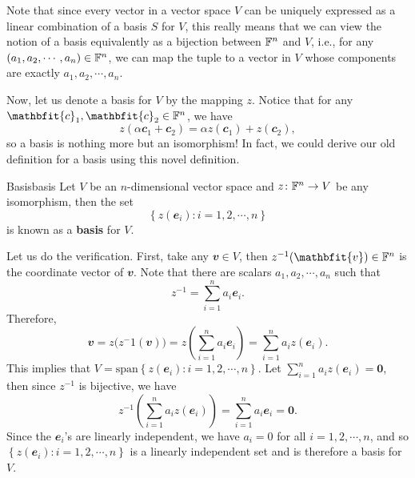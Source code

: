 \documentclass[math, code]{amznotes}
\theoremstyle{remark}
\newcommand{\zero}{\mathbf{0}}
\begin{document}
Note that since every vector in a vector space $V$ can be uniquely expressed as a linear combination of a basis $S$ for $V$, this really means that we can view the notion of a basis equivalently as a bijection between $\mathbb{F}^n$ and $V$, i.e., for any $(a_1, a_2, \cdots, a_n) \in \mathbb{F}^n$, we can map the tuple to a vector in $V$ whose components are exactly $a_1, a_2, \cdots, a_n$.

Now, let us denote a basis for $V$ by the mapping $z$. Notice that for any $\mathbfit{c}_1, \mathbfit{c}_2 \in \F^n$, we have 
\begin{equation*}
    z(\alpha\mathbfit{c}_1 + \mathbfit{c}_2) = \alpha z(\mathbfit{c}_1) + z(\mathbfit{c}_2),
\end{equation*}
so a basis is nothing more but an isomorphism! In fact, we could derive our old definition for a basis using this novel definition.
\begin{dfnbox}{Basis}{basis}
    Let $V$ be an $n$-dimensional vector space and $z \colon \mathbb{F}^n \to V$ be any isomorphism, then the set 
    \begin{equation*}
        \left\{z\left(\mathbfit{e}_i\right) \colon i = 1, 2, \cdots, n\right\}
    \end{equation*}
    is known as a {\color{red} \textbf{basis}} for $V$.
\end{dfnbox}
Let us do the verification. First, take any $\mathbfit{v} \in V$, then $z^{-1}(\mathbfit{v}) \in \F^n$ is the coordinate vector of $\mathbfit{v}$. Note that there are scalars $a_1, a_2, \cdots, a_n$ such that 
\begin{equation*}
    z^{-1} = \sum_{i = 1}^{n}a_i\mathbfit{e}_i.
\end{equation*}
Therefore,
\begin{equation*}
    \mathbfit{v} = z\bigl(z^-1(\mathbfit{v})\bigr) = z\left(\sum_{i = 1}^{n}a_i\mathbfit{e}_i\right) = \sum_{i = 1}^{n}a_iz(\mathbfit{e}_i).
\end{equation*}
This implies that $V = \mathrm{span}\left\{z\left(\mathbfit{e}_i\right) \colon i = 1, 2, \cdots, n\right\}$. Let $\sum_{i = 1}^{n}a_iz(\mathbfit{e}_i) = \zero$, then since $z^{-1}$ is bijective, we have 
\begin{equation*}
    z^{-1}\left(\sum_{i = 1}^{n}a_iz(\mathbfit{e}_i)\right) = \sum_{i = 1}^{n}a_i\mathbfit{e}_i = \zero.
\end{equation*}
Since the $\mathbfit{e}_i$'s are linearly independent, we have $a_i = 0$ for all $i = 1, 2, \cdots, n$, and so $\left\{z\left(\mathbfit{e}_i\right) \colon i = 1, 2, \cdots, n\right\}$ is a linearly independent set and is therefore a basis for $V$.
\end{document}
